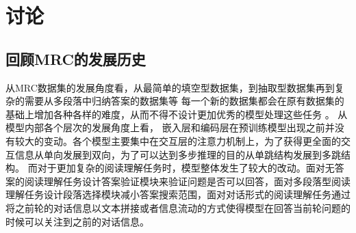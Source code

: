 \section{讨论}
\subsection{回顾MRC的发展历史}
从MRC数据集的发展角度看，从最简单的填空型数据集，到抽取型数据集再到复杂的需要从多段落中归纳答案的数据集等
每一个新的数据集都会在原有数据集的基础上增加各种各样的难度，从而不得不设计更加优秀的模型处理这些任务
。
从模型内部各个层次的发展角度上看，
嵌入层和编码层在预训练模型出现之前并没有较大的变动。各个模型主要集中在交互层的注意力机制上，为了获得更全面的交互信息从单向发展到双向，为了可以达到多步推理的目的从单跳结构发展到多跳结构。
而对于更加复杂的阅读理解任务时，模型整体发生了较大的改动。面对无答案的阅读理解任务设计答案验证模块来验证问题是否可以回答，面对多段落型阅读理解任务设计段落选择模块减小答案搜索范围，面对对话形式的阅读理解任务通过将之前轮的对话信息以文本拼接或者信息流动的方式使得模型在回答当前轮问题的时候可以关注到之前的对话信息。


